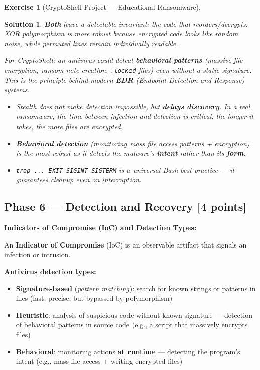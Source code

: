 \documentclass[a4paper,11pt]{article}
\theoremstyle{plain}
\newtheorem{correction}{Solution}
\theoremstyle{definition}
\newtheorem{exercice}{Exercise}
\begin{document}
\begin{exercice}[CryptoShell Project --- Educational Ransomware]
\begin{correction}
\textbf{Both} leave a detectable invariant: the code that reorders/decrypts. XOR polymorphism is more robust because encrypted code looks like random noise, while permuted lines remain individually readable.

For CryptoShell: an antivirus could detect \textbf{behavioral patterns} (massive file encryption, ransom note creation, \texttt{.locked} files) even without a static signature. This is the principle behind modern \textbf{EDR} (\textit{Endpoint Detection and Response}) systems.

\begin{pointcle}
\begin{itemize}
    \item Stealth does not make detection impossible, but \textbf{delays discovery}. In a real ransomware, the time between infection and detection is critical: the longer it takes, the more files are encrypted.
    \item \textbf{Behavioral detection} (monitoring mass file access patterns + encryption) is the most robust as it detects the malware's \textbf{intent} rather than its \textbf{form}.
    \item \texttt{trap ... EXIT SIGINT SIGTERM} is a universal Bash best practice --- it guarantees cleanup even on interruption.
\end{itemize}
\end{pointcle}

\end{correction}



\subsection*{Phase 6 --- Detection and Recovery \hfill \normalsize [4 points]}

\begin{rappel}
\textbf{Indicators of Compromise (IoC) and Detection Types:}

An \textbf{Indicator of Compromise} (IoC) is an observable artifact that signals an infection or intrusion.

\medskip
\textbf{Antivirus detection types:}
\begin{itemize}
    \item \textbf{Signature-based} (\textit{pattern matching}): search for known strings or patterns in files (fast, precise, but bypassed by polymorphism)
    \item \textbf{Heuristic}: analysis of suspicious code without known signature --- detection of behavioral patterns in source code (e.g., a script that massively encrypts files)
    \item \textbf{Behavioral}: monitoring actions \textbf{at runtime} --- detecting the program's intent (e.g., mass file access + writing encrypted files)
\end{itemize}


\end{rappel}
\end{exercice}
\end{document}
